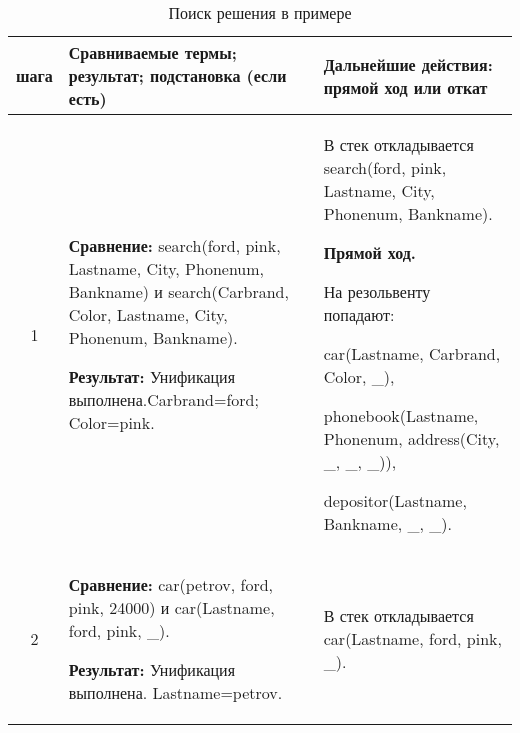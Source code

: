 \renewcommand{\arraystretch}{1.75}
\footnotesize
\begin{longtable}{|c|p{}|p{}|}
    \caption{Поиск решения в примере }\label{tbl:ex1} \\
    \hline
    \textnumero{} шага & Сравниваемые термы; результат; подстановка (если есть)  & Дальнейшие действия: прямой ход или откат \\
    \hline

    1
                       &
\textbf{Сравнение:} \newline
    search(ford, pink, Lastname, City, Phonenum, Bankname)
    \newline и \newline
    search(Carbrand, Color, Lastname, City, Phonenum, Bankname).
    \newline

    \textbf{Результат:} \newline
    Унификация выполнена.\newline{}Carbrand=ford; Color=pink.
                       &
                       В стек откладывается\newline
                       search(ford, pink, Lastname, City, Phonenum, Bankname).
                       \newline

                       \textbf{Прямой ход.}

                       На резольвенту попадают:

                       car(Lastname, Carbrand, Color, \_),

                       phonebook(Lastname, Phonenum, address(City, \_, \_, \_)),

                       depositor(Lastname, Bankname, \_, \_).
                       \\ \hline

    2
                       &
\textbf{Сравнение:} \newline
    car(petrov, ford,    pink,   24000)
    \newline и \newline
    car(Lastname, ford, pink, \_).
    \newline

    \textbf{Результат:} \newline
    Унификация выполнена.\newline{}
    Lastname=petrov.
                       &
    В стек откладывается\newline
    car(Lastname, ford, pink, \_).
    \newline


\end{longtable}
